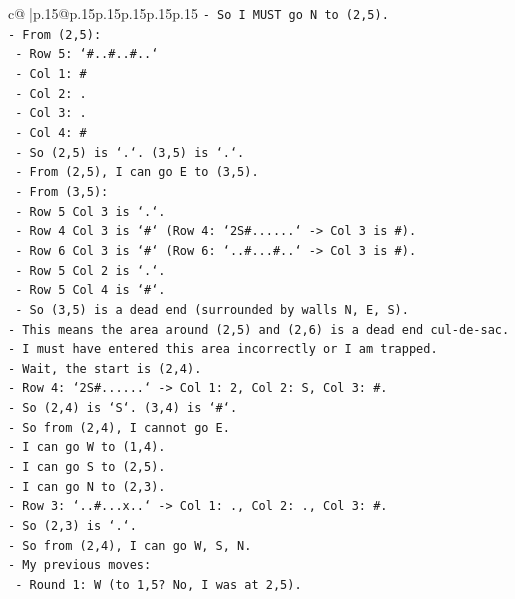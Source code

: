 \documentclass{article}
\begin{document}
{\begin{supertabular}{c@{$\;$}|p{.15\linewidth}@{}p{.15\linewidth}p{.15\linewidth}p{.15\linewidth}p{.15\linewidth}p{.15\linewidth}}
{{{\texttt{{-} So I MUST go N to (2,5).} \\
\texttt{{-} From (2,5):} \\
\texttt{  {-} Row 5: `\#..\#..\#..`} \\
\texttt{  {-} Col 1: \#} \\
\texttt{  {-} Col 2: .} \\
\texttt{  {-} Col 3: .} \\
\texttt{  {-} Col 4: \#} \\
\texttt{  {-} So (2,5) is `.`. (3,5) is `.`.} \\
\texttt{  {-} From (2,5), I can go E to (3,5).} \\
\texttt{  {-} From (3,5):} \\
\texttt{    {-} Row 5 Col 3 is `.`.} \\
\texttt{    {-} Row 4 Col 3 is `\#` (Row 4: `2S\#......` {-}> Col 3 is \#).} \\
\texttt{    {-} Row 6 Col 3 is `\#` (Row 6: `..\#...\#..` {-}> Col 3 is \#).} \\
\texttt{    {-} Row 5 Col 2 is `.`.} \\
\texttt{    {-} Row 5 Col 4 is `\#`.} \\
\texttt{    {-} So (3,5) is a dead end (surrounded by walls N, E, S).} \\
\texttt{{-} This means the area around (2,5) and (2,6) is a dead end cul{-}de{-}sac.} \\
\texttt{{-} I must have entered this area incorrectly or I am trapped.} \\
\texttt{{-} Wait, the start is (2,4).} \\
\texttt{{-} Row 4: `2S\#......` {-}> Col 1: 2, Col 2: S, Col 3: \#.} \\
\texttt{{-} So (2,4) is `S`. (3,4) is `\#`.} \\
\texttt{{-} So from (2,4), I cannot go E.} \\
\texttt{{-} I can go W to (1,4).} \\
\texttt{{-} I can go S to (2,5).} \\
\texttt{{-} I can go N to (2,3).} \\
\texttt{{-} Row 3: `..\#...x..` {-}> Col 1: ., Col 2: ., Col 3: \#.} \\
\texttt{{-} So (2,3) is `.`.} \\
\texttt{{-} So from (2,4), I can go W, S, N.} \\
\texttt{{-} My previous moves:} \\
\texttt{  {-} Round 1: W (to 1,5? No, I was at 2,5).} \\
}}}
\end{supertabular}}
\end{document}
